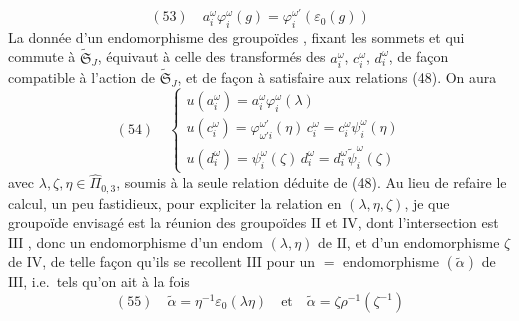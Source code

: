 \documentclass[11pt,a4paper]{article}
\begin{document}
\[
(53)\quad a_i^{\omega} \varphi_i^{\omega}(g) = \varphi_i^{\omega'}(\varepsilon_0(g))
\]
La donnée d'un endomorphisme des groupoïdes , fixant les sommets et qui commute à $\widetilde{\mathfrak{S}}_J$, équivaut à celle des  transformés des $a_i^{\omega}$, $c_i^{\omega}$, $d_i^{\omega}$, de façon compatible à l'action de $\widetilde{\mathfrak{S}}_J$, et de façon à satisfaire aux relations (48). On aura
\[
(54)\quad
\begin{cases}
u(a_i^{\omega}) = a_i^{\omega} \varphi_i^{\omega}(\lambda) \\
u(c_i^{\omega}) = \varphi^{\omega'}_{\omega' i}(\eta)\, c_i^{\omega} = c_i^{\omega} \psi_i^{\omega}(\eta) \\
u(d_i^{\omega}) = \psi_i^{\omega}(\zeta)\, d_i^{\omega} = d_i^{\omega} \tilde\psi_i^{\omega}(\zeta)
\end{cases}
\]
avec $\lambda, \zeta, \eta \in \widehat{\Pi}_{0,3}$, soumis à la seule relation déduite de (48). Au lieu de refaire le calcul, un peu fastidieux, pour expliciter la relation en $(\lambda, \eta, \zeta)$, je  que   groupoïde envisagé est la réunion des groupoïdes $\mathrm{II}$ et $\mathrm{IV}$, dont l'intersection est $\mathrm{III}$ , donc un endomorphisme  d'un  endom $(\lambda, \eta)$ de $\mathrm{II}$, et d'un endomorphisme $\zeta$ de $\mathrm{IV}$, de telle façon qu'ils se recollent \struck{\ill{}} $\mathrm{III}$ pour un $=$ endomorphisme $(\tilde\alpha)$ de $\mathrm{III}$, i.e.\ tels qu'on ait à la fois
\[
(55)\quad \tilde\alpha = \eta^{-1} \varepsilon_0(\lambda\eta) \quad \text{et} \quad \tilde\alpha = \zeta \rho^{-1}(\zeta^{-1})
\]
\end{document}
